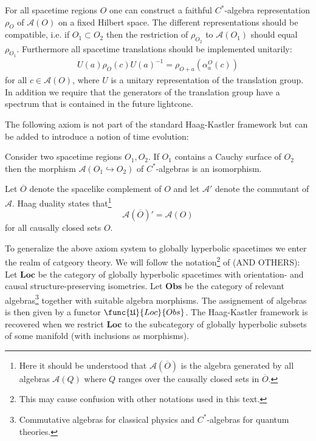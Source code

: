 	\begin{axiom}[Spectrum]
		For all spacetime regions $O$ one can construct a faithful $C^*$-algebra representation $\rho_O$ of $\mathcal{A}(O)$ on a fixed Hilbert space. The different representations should be compatible, i.e. if $O_1\subset O_2$ then the restriction of $\rho_{O_2}$ to $\mathcal{A}(O_1)$ should equal $\rho_{O_1}$. Furthermore all spacetime translations should be implemented unitarily:
		\begin{gather}
			U(a)\rho_O(c)U(a)^{-1} = \rho_{O+a}(\alpha^O_a(c))
		\end{gather}
		for all $c\in\mathcal{A}(O)$, where $U$ is a unitary representation of the translation group. In addition we require that the generators of the translation group have a spectrum that is contained in the future lightcone.
	\end{axiom}
	
	The following axiom is not part of the standard Haag-Kastler framework but can be added to introduce a notion of time evolution:
	\begin{axiom}
		Consider two spacetime regions $O_1, O_2$. If $O_1$ contains a Cauchy surface of $O_2$ then the morphism $\mathcal{A}(O_1\hookrightarrow O_2)$ of $C^*$-algebras is an isomorphism.
	\end{axiom}
	
	\begin{axiom}
		Let $\overline{O}$ denote the spacelike complement of $O$ and let $\mathcal{A}'$ denote the commutant of $\mathcal{A}$. Haag duality states that\footnote{Here it should be understood that $\mathcal{A}\left(\overline{O}\right)$ is the algebra generated by all algebras $\mathcal{A}(Q)$ where $Q$ ranges over the causally closed sets in $\overline{O}$.}
		\begin{equation}
			\mathcal{A}\left(\overline{O}\right)' = \mathcal{A}(O)
		\end{equation}
		for all causally closed sets $O$.
	\end{axiom}
	
	To generalize the above axiom system to globally hyperbolic spacetimes we enter the realm of catgeory theory. We will follow the notation\footnote{This may cause confusion with other notations used in this text.} of \cite{cal_strobl} (AND OTHERS): Let $\textbf{Loc}$ be the category of globally hyperbolic spacetimes with orientation- and causal structure-preserving isometries. Let $\textbf{Obs}$ be the category of relevant algebras\footnote{Commutative algebras for classical physics and $C^*$-algebras for quantum theories.} together with suitable algebra morphisms. The assignement of algebras is then given by a functor $\func{\mathfrak{U}}{Loc}{Obs}$. The Haag-Kastler framework is recovered when we restrict $\textbf{Loc}$ to the subcategory of globally hyperbolic subsets of some manifold (with inclusions as morphisms).
	
